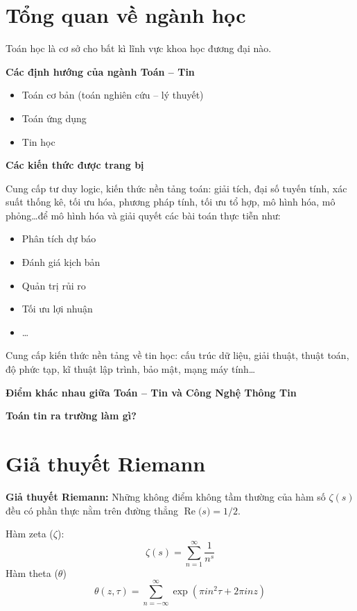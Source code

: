 \documentclass[14pt]{extarticle}
\newcommand{\real}[1]{\operatorname{Re}{#1}}
\begin{document}
\section{Tổng quan về ngành học}
Toán học là cơ sở cho bất kì lĩnh vực khoa học đương đại nào.

\textbf{Các định hướng của ngành Toán -- Tin}
\begin{itemize}
	\item Toán cơ bản (toán nghiên cứu -- lý thuyết)
	\item Toán ứng dụng
	\item Tin học
\end{itemize}

\textbf{Các kiến thức được trang bị}\par
Cung cấp tư duy logic, kiến thức nền tảng toán: giải tích, đại số tuyến tính, xác suất thống kê, tối ưu hóa, phương pháp tính, tối ưu tổ hợp, mô hình hóa, mô phỏng\ldots để mô hình hóa và giải quyết các bài toán thực tiễn như:
\begin{itemize}
	\item Phân tích dự báo
	\item Đánh giá kịch bản
	\item Quản trị rủi ro
	\item Tối ưu lợi nhuận
	\item \ldots
\end{itemize}

Cung cấp kiến thức nền tảng về tin học: cấu trúc dữ liệu, giải thuật, thuật toán, độ phức tạp, kĩ thuật lập trình, bảo mật, mạng máy tính\ldots

\textbf{Điểm khác nhau giữa Toán -- Tin và Công Nghệ Thông Tin}\par

\textbf{Toán tin ra trường làm gì?}\par

\section{Giả thuyết Riemann}

\textbf{Giả thuyết Riemann: }Những không điểm không tầm thường của hàm số $\zeta(s)$ đều có phần thực nằm trên đường thẳng $\real(s) = 1/2$.\par
Hàm zeta ($\zeta$):
\begin{equation*}
	\zeta(s) = \sum_{n=1}^\infty \frac 1 {n^s}
\end{equation*}
Hàm theta ($\theta$)
\begin{equation*}
	\theta(z,\tau) = \sum_{n=-\infty}^\infty \exp(\pi i n^2 \tau + 2\pi i n z)
\end{equation*}
\end{document}
